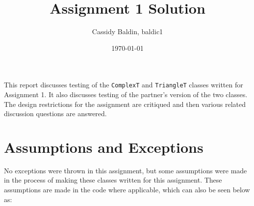 \documentclass[12pt]{article}
\title{Assignment 1 Solution}
\author{Cassidy Baldin, baldic1}
\date{\today}
\begin{document}
\maketitle

This report discusses testing of the \verb|ComplexT| and \verb|TriangleT|
classes written for Assignment 1. It also discusses testing of the partner's
version of the two classes. The design restrictions for the assignment
are critiqued and then various related discussion questions are answered.

\section{Assumptions and Exceptions} \label{AssumptAndExcept}

No exceptions were thrown in this assignment, but some assumptions were made 
in the process of making these classes written for this assignment. These 
assumptions are made in the code where applicable, which can also be seen below as:
\end{document}

